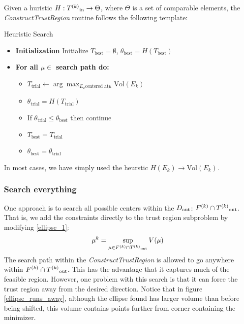 Given a huristic $H : {T^{(k)}}_{\text{in}} \to \Theta$, where $\Theta$ is a set of comparable elements, the \emph{ConstructTrustRegion} routine follows the following template:

\begin{algorithm}[H]
    \caption{Heuristic Search}
    \label{heuristic_search}
    \begin{itemize}
        \item[] \textbf{Initialization} Initialize $T_{\text{best}} = \emptyset$, $\theta_{\text{best}} = H(T_{\text{best}})$
            
        \item[] \textbf{For all $\mu \in$ search path do:} \begin{itemize}
                \item[] $T_{\text{trial}} \gets \arg\max_{E_k \text{centered at} \mu} \text{Vol}(E_k)$
                \item[] $\theta_{\text{trial}} = H(T_{\text{trial}})$
                \item[] If $\theta_{\text{trial}} \le \theta_{\text{best}}$ then continue
                \item[] $T_{\text{best}} = T_{\text{trial}}$
                \item[] $\theta_{\text{best}} = \theta_{\text{trial}}$
            \end{itemize}
    \end{itemize}
\end{algorithm}

In most cases, we have simply used the heurstic $H(E_k) \to \text{Vol}(E_k)$.

\subsubsection{Search everything}

One approach is to search all possible centers within the $ D_{\text{out}} $:
$ {F}^{(k)} \cap {T^{(k)}}_{\text{out}}$.
That is, we add the constraints directly to the trust region subproblem by modifying \cref{ellipse_1}:
$$\mu^k = \sup_{\mu \in {F}^{(k)} \cap {T^{(k)}}_{\text{out}}} V(\mu)$$
The search path within the \emph{ConstructTrustRegion} is allowed to go anywhere within $ {F}^{(k)} \cap {T^{(k)}}_{\text{out}}$.
This has the advantage that it captures much of the feasible region.
However, one problem with this search is that it can force the trust region away from the desired direction.
Notice that in figure \cref{ellipse_runs_away}, although the ellipse found has larger volume than before being shifted, this volume contains points further from corner containing the minimizer.

